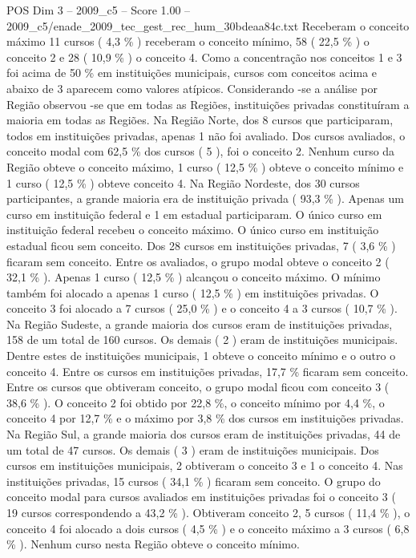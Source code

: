 \begin{textsample}{POS Dim 3 – 2009\_c5 – Score 1.00 – 2009\_c5/enade\_2009\_tec\_gest\_rec\_hum\_30bdeaa84c.txt}
Receberam o conceito máximo 11 cursos ( 4,3 \% ) receberam o conceito mínimo, 58 ( 22,5 \% ) o conceito 2 e 28 ( 10,9 \% ) o conceito 4.
Como a concentração nos conceitos 1 e 3 foi acima de 50 \% em instituições municipais, cursos com conceitos acima e abaixo de 3 aparecem como valores atípicos.
Considerando -se a análise por Região observou -se que em todas as Regiões, instituições privadas constituíram a maioria em todas as Regiões.
Na Região Norte, dos 8 cursos que participaram, todos em instituições privadas, apenas 1 não foi avaliado.
Dos cursos avaliados, o conceito modal com 62,5 \% dos cursos ( 5 ), foi o conceito 2.
Nenhum curso da Região obteve o conceito máximo, 1 curso ( 12,5 \% ) obteve o conceito mínimo e 1 curso ( 12,5 \% ) obteve conceito 4.
Na Região Nordeste, dos 30 cursos participantes, a grande maioria era de instituição privada ( 93,3 \% ).
Apenas um curso em instituição federal e 1 em estadual participaram.
O único curso em instituição federal recebeu o conceito máximo.
O único curso em instituição estadual ficou sem conceito.
Dos 28 cursos em instituições privadas, 7 ( 3,6 \% ) ficaram sem conceito.
Entre os avaliados, o grupo modal obteve o conceito 2 ( 32,1 \% ).
Apenas 1 curso ( 12,5 \% ) alcançou o conceito máximo.
O mínimo também foi alocado a apenas 1 curso ( 12,5 \% ) em instituições privadas.
O conceito 3 foi alocado a 7 cursos ( 25,0 \% ) e o conceito 4 a 3 cursos ( 10,7 \% ).
Na Região Sudeste, a grande maioria dos cursos eram de instituições privadas, 158 de um total de 160 cursos.
Os demais ( 2 ) eram de instituições municipais.
Dentre estes de instituições municipais, 1 obteve o conceito mínimo e o outro o conceito 4.
Entre os cursos em instituições privadas, 17,7 \% ficaram sem conceito.
Entre os cursos que obtiveram conceito, o grupo modal ficou com conceito 3 ( 38,6 \% ).
O conceito 2 foi obtido por 22,8 \%, o conceito mínimo por 4,4 \%, o conceito 4 por 12,7 \% e o máximo por 3,8 \% dos cursos em instituições privadas.
Na Região Sul, a grande maioria dos cursos eram de instituições privadas, 44 de um total de 47 cursos.
Os demais ( 3 ) eram de instituições municipais.
Dos cursos em instituições municipais, 2 obtiveram o conceito 3 e 1 o conceito 4.
Nas instituições privadas, 15 cursos ( 34,1 \% ) ficaram sem conceito.
O grupo do conceito modal para cursos avaliados em instituições privadas foi o conceito 3 ( 19 cursos correspondendo a 43,2 \% ).
Obtiveram conceito 2, 5 cursos ( 11,4 \% ), o conceito 4 foi alocado a dois cursos ( 4,5 \% ) e o conceito máximo a 3 cursos ( 6,8 \% ).
Nenhum curso nesta Região obteve o conceito mínimo.

\end{textsample}
